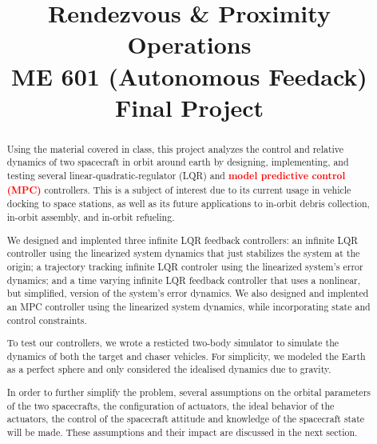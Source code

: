 \documentclass[conference]{IEEEtran}
\begin{document}
\newcommand\todo[1]{\textcolor{red}{\textbf{#1}}}
\newcommand\mat[1]{\begin{bmatrix}#1\end{bmatrix}}

\title{Rendezvous \& Proximity Operations \\
{\footnotesize ME 601 (Autonomous Feedack) Final Project}
}

\author{
}




\maketitle

\begin{abstract}

Using the material covered in class, this project analyzes the control
and relative dynamics of two spacecraft in orbit around earth by designing,
implementing, and testing several linear-quadratic-regulator (LQR) and
\todo{model predictive control (MPC)} controllers. This is a
subject of interest due to its current usage in vehicle docking to space
stations, as well as its future applications to in-orbit debris collection,
in-orbit assembly, and in-orbit refueling.

We designed and implented three infinite LQR feedback controllers: an infinite LQR
controller using the linearized system dynamics that just stabilizes the system at the
origin; a trajectory tracking infinite LQR controler using the linearized system's
error dynamics; and a time varying infinite LQR feedback controller that uses a
nonlinear, but simplified, version of the system's error dynamics. We also
designed and implented an MPC controller using the linearized
system dynamics, while incorporating state and control constraints.

To test our controllers, we wrote a resticted two-body simulator to simulate
the dynamics of both the target and chaser vehicles. For simplicity, we modeled
the Earth as a perfect sphere and only considered the idealised dynamics due to
gravity.

In order to further simplify the problem, several assumptions on the orbital
parameters of the two spacecrafts, the configuration of actuators, the ideal
behavior of the actuators, the control of the spacecraft attitude and knowledge
of the spacecraft state will be made. These assumptions and their impact are
discussed in the next section.

\end{abstract}
\end{document}
